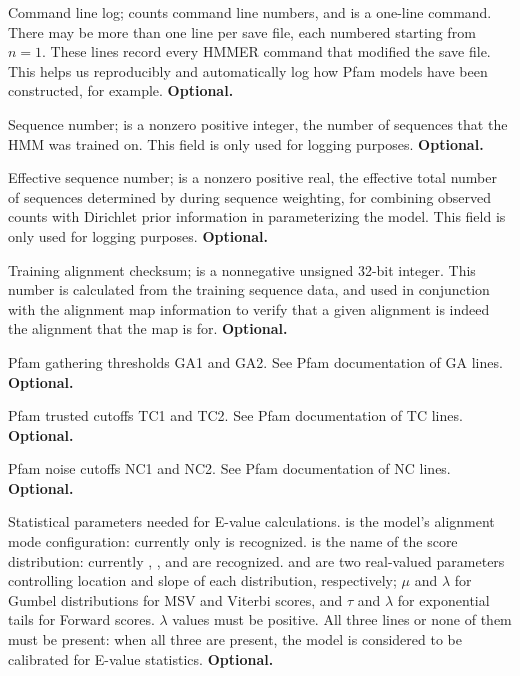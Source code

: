 \begin{sreitems}{}
\item [\emprog{COM [<n>] <s>}] Command line log;  counts
command line numbers, and  is a one-line command. There may
be more than one  line per save file, each numbered starting
from $n=1$. These lines record every HMMER command that modified the
save file. This helps us reproducibly and automatically log how Pfam
models have been constructed, for example. \textbf{Optional.}

\item [\emprog{NSEQ  <d>}] Sequence number;  is a nonzero
positive integer, the number of sequences that the HMM was trained on.
This field is only used for logging purposes.
\textbf{Optional.}

\item [\emprog{EFFN <f>}] Effective sequence number;  is a
nonzero positive real, the effective total number of sequences
determined by  during sequence weighting, for combining
observed counts with Dirichlet prior information in parameterizing the
model. This field is only used for logging purposes.
\textbf{Optional.}

\item [\emprog{CKSUM <d>}] Training alignment checksum;  is
  a nonnegative unsigned 32-bit integer. This number is calculated
  from the training sequence data, and used in conjunction with the
  alignment map information to verify that a given alignment is indeed
  the alignment that the map is for. \textbf{Optional.}

\item [\emprog{GA    <f> <f>}] Pfam gathering thresholds GA1 and GA2.
See Pfam documentation of GA lines. \textbf{Optional.}

\item [\emprog{TC <f> <f>}] Pfam trusted cutoffs TC1 and TC2.  See
Pfam documentation of TC lines. \textbf{Optional.}

\item [\emprog{NC <f> <f>}] Pfam noise cutoffs NC1 and NC2.  See Pfam
documentation of NC lines. \textbf{Optional.}

\item [\emprog{STATS <s1> <s2> <f1> <f2>}] Statistical parameters
  needed for E-value calculations.  is the model's
  alignment mode configuration: currently only  is
  recognized.  is the name of the score distribution:
  currently , , and  are
  recognized.   and  are two real-valued
  parameters controlling location and slope of each distribution,
  respectively; $\mu$ and $\lambda$ for Gumbel distributions for MSV
  and Viterbi scores, and $\tau$ and $\lambda$ for exponential tails
  for Forward scores.  $\lambda$ values must be positive.  All three
  lines or none of them must be present: when all three are present,
  the model is considered to be calibrated for E-value
  statistics. \textbf{Optional.}


\end{sreitems}

